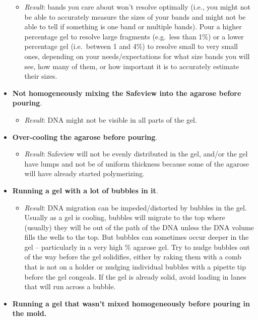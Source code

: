 \documentclass[
  letterpaper,
  DIV=11,
  numbers=noendperiod]{scrreprt}
\providecommand{\tightlist}{%
  \setlength{\itemsep}{0pt}\setlength{\parskip}{0pt}}\usepackage{longtable,booktabs,array}
\begin{document}
\begin{itemize}
  \begin{itemize}
  \tightlist
  \item
    \emph{Result}: bands you care about won't resolve optimally (i.e.,
    you might not be able to accurately measure the sizes of your bands
    and might not be able to tell if something is one band or multiple
    bands). Pour a higher percentage gel to resolve large fragments
    (e.g.~less than 1\%) or a lower percentage gel (i.e.~between 1 and
    4\%) to resolve small to very small ones, depending on your
    needs/expectations for what size bands you will see, how many of
    them, or how important it is to accurately estimate their sizes.
  \end{itemize}
\item
  \textbf{Not homogeneously mixing the Safeview into the agarose before
  pouring}.

  \begin{itemize}
  \tightlist
  \item
    \emph{Result}: DNA might not be visible in all parts of the gel.
  \end{itemize}
\item
  \textbf{Over-cooling the agarose before pouring}.

  \begin{itemize}
  \tightlist
  \item
    \emph{Result}: Safeview will not be evenly distributed in the gel,
    and/or the gel have lumps and not be of uniform thickness because
    some of the agarose will have already started polymerizing.
  \end{itemize}
\item
  \textbf{Running a gel with a lot of bubbles in it}.

  \begin{itemize}
  \tightlist
  \item
    \emph{Result}: DNA migration can be impeded/distorted by bubbles in
    the gel. Usually as a gel is cooling, bubbles will migrate to the
    top where (usually) they will be out of the path of the DNA unless
    the DNA volume fills the wells to the top. But bubbles can sometimes
    occur deeper in the gel -- particularly in a very high \% agarose
    gel. Try to nudge bubbles out of the way before the gel solidifies,
    either by raking them with a comb that is not on a holder or nudging
    individual bubbles with a pipette tip before the gel congeals. If
    the gel is already solid, avoid loading in lanes that will run
    across a bubble.
  \end{itemize}
\item
  \textbf{Running a gel that wasn't mixed homogeneously before pouring
  in the mold.}


\end{itemize}
\end{document}
